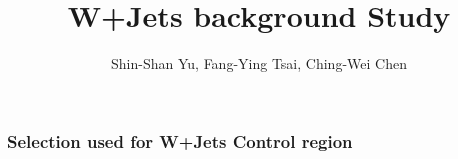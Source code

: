 \documentclass{beamer}
\title[W+Jets background Study]{W+Jets background Study}
\author[Raman Khurana]{Shin-Shan Yu, Fang-Ying Tsai, Ching-Wei Chen}%
\begin{document}
 

\begin{frame} 

\titlepage 
\end{frame} 


\begin{frame}
\frametitle{Selection used for W+Jets Control region}
\begin{itemize}
\end{itemize}
\end{frame}


%
%
%
\end{document}
